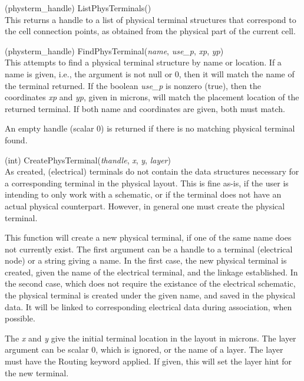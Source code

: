 \begin{description}
\item{(physterm\_handle) \vt ListPhysTerminals()}\\
This returns a handle to a list of physical terminal structures that
correspond to the cell connection points, as obtained from the
physical part of the current cell.

\item{(physterm\_handle) \vt FindPhysTerminal({\it name\/},
 {\it use\_p\/}, {\it xp\/}, {\it yp\/})}\\
This attempts to find a physical terminal structure by name or
location.  If a name is given, i.e., the argument is not null or 0,
then it will match the name of the terminal returned.  If the boolean
{\it use\_p} is nonzero (true), then the coordinates {\it xp} and {\it
yp\/}, given in microns, will match the placement location of the
returned terminal.  If both name and coordinates are given, both must
match.

An empty handle (scalar 0) is returned if there is no matching
physical terminal found.

\item{(int) \vt CreatePhysTerminal({\it thandle\/}, {\it x\/}, {\it y\/},
 {\it layer\/})}\\
As created, (electrical) terminals do not contain the data structures
necessary for a corresponding terminal in the physical layout.  This
is fine as-is, if the user is intending to only work with a schematic,
or if the terminal does not have an actual physical counterpart. 
However, in general one must create the physical terminal.

This function will create a new physical terminal, if one of the same
name does not currently exist.  The first argument can be a handle to
a terminal (electrical node) or a string giving a name.  In the first
case, the new physical terminal is created, given the name of the
electrical terminal, and the linkage established.  In the second case,
which does not require the existance of the electrical schematic, the
physical terminal is created under the given name, and saved in the
physical data.  It will be linked to corresponding electrical data
during association, when possible.

The {\it x} and {\it y} give the initial terminal location in the
layout in microns.  The layer argument can be scalar 0, which is
ignored, or the name of a layer.  The layer must have the {\et
Routing} keyword applied.  If given, this will set the layer hint for
the new terminal.


\end{description}
